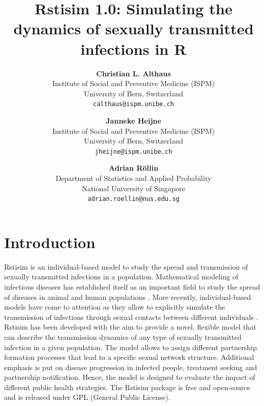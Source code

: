 \documentclass[11pt]{article}
\begin{document}
\title{\bf Rstisim 1.0: Simulating the dynamics of sexually transmitted
infections in R}

\author{
\textbf{Christian L. Althaus} \\
Institute of Social and Preventive Medicine (ISPM)\\
University of Bern, Switzerland\\
\texttt{calthaus@ispm.unibe.ch}
\and 
\textbf{Janneke Heijne}\\
Institute of Social and Preventive Medicine (ISPM)\\
University of Bern, Switzerland\\
\texttt{jheijne@ispm.unibe.ch}
\and
\textbf{Adrian R\"ollin}\\
Department of Statistics and Applied Probability\\
National University of Singapore\\
\texttt{adrian.roellin@nus.edu.sg}
}

\date{}

\maketitle

\tableofcontents
\newpage

\section{Introduction}
Rstisim is an individual-based model to study the spread and transmission of sexually transmitted infections in a population. Mathematical modeling of infectious diseases has established itself as an important field to study the spread of diseases in animal and human populations \citep{Anderson:1991,Diekmann:2000,Keeling:2008}. More recently, individual-based models have come to attention as they allow to explicitly simulate the transmission of infections through sexual contacts between different individuals \citep{Kretzschmar:1996,Ghani:1997,Ploeg:1998,Turner:2006,Low:2007,Gray:2009,Leclerc:2009}. Rstisim has been developed with the aim to provide a novel, flexible model that can describe the transmission dynamics of any type of sexually transmitted infection in a given population. The model allows to assign different partnership formation processes that lead to a specific sexual network structure. Additional emphasis is put on disease progression in infected people, treatment seeking and partnership notification. Hence, the model is designed to evaluate the impact of different public health strategies. The Rstisim package is free and open-source and is released under GPL (General Public License).
\end{document}
